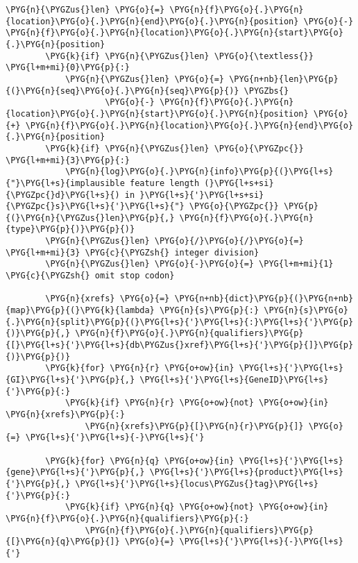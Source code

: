 \begin{Verbatim}[commandchars=\\\{\}]
        \PYG{n}{\PYGZus{}len} \PYG{o}{=} \PYG{n}{f}\PYG{o}{.}\PYG{n}{location}\PYG{o}{.}\PYG{n}{end}\PYG{o}{.}\PYG{n}{position} \PYG{o}{-} \PYG{n}{f}\PYG{o}{.}\PYG{n}{location}\PYG{o}{.}\PYG{n}{start}\PYG{o}{.}\PYG{n}{position}
        \PYG{k}{if} \PYG{n}{\PYGZus{}len} \PYG{o}{\textless{}} \PYG{l+m+mi}{0}\PYG{p}{:}
            \PYG{n}{\PYGZus{}len} \PYG{o}{=} \PYG{n+nb}{len}\PYG{p}{(}\PYG{n}{seq}\PYG{o}{.}\PYG{n}{seq}\PYG{p}{)} \PYGZbs{}
                    \PYG{o}{-} \PYG{n}{f}\PYG{o}{.}\PYG{n}{location}\PYG{o}{.}\PYG{n}{start}\PYG{o}{.}\PYG{n}{position} \PYG{o}{+} \PYG{n}{f}\PYG{o}{.}\PYG{n}{location}\PYG{o}{.}\PYG{n}{end}\PYG{o}{.}\PYG{n}{position}
        \PYG{k}{if} \PYG{n}{\PYGZus{}len} \PYG{o}{\PYGZpc{}} \PYG{l+m+mi}{3}\PYG{p}{:}
            \PYG{n}{log}\PYG{o}{.}\PYG{n}{info}\PYG{p}{(}\PYG{l+s}{"}\PYG{l+s}{implausible feature length (}\PYG{l+s+si}{\PYGZpc{}d}\PYG{l+s}{) in }\PYG{l+s}{'}\PYG{l+s+si}{\PYGZpc{}s}\PYG{l+s}{'}\PYG{l+s}{"} \PYG{o}{\PYGZpc{}} \PYG{p}{(}\PYG{n}{\PYGZus{}len}\PYG{p}{,} \PYG{n}{f}\PYG{o}{.}\PYG{n}{type}\PYG{p}{)}\PYG{p}{)}
        \PYG{n}{\PYGZus{}len} \PYG{o}{/}\PYG{o}{/}\PYG{o}{=} \PYG{l+m+mi}{3} \PYG{c}{\PYGZsh{} integer division}
        \PYG{n}{\PYGZus{}len} \PYG{o}{-}\PYG{o}{=} \PYG{l+m+mi}{1} \PYG{c}{\PYGZsh{} omit stop codon}

        \PYG{n}{xrefs} \PYG{o}{=} \PYG{n+nb}{dict}\PYG{p}{(}\PYG{n+nb}{map}\PYG{p}{(}\PYG{k}{lambda} \PYG{n}{s}\PYG{p}{:} \PYG{n}{s}\PYG{o}{.}\PYG{n}{split}\PYG{p}{(}\PYG{l+s}{'}\PYG{l+s}{:}\PYG{l+s}{'}\PYG{p}{)}\PYG{p}{,} \PYG{n}{f}\PYG{o}{.}\PYG{n}{qualifiers}\PYG{p}{[}\PYG{l+s}{'}\PYG{l+s}{db\PYGZus{}xref}\PYG{l+s}{'}\PYG{p}{]}\PYG{p}{)}\PYG{p}{)}
        \PYG{k}{for} \PYG{n}{r} \PYG{o+ow}{in} \PYG{l+s}{'}\PYG{l+s}{GI}\PYG{l+s}{'}\PYG{p}{,} \PYG{l+s}{'}\PYG{l+s}{GeneID}\PYG{l+s}{'}\PYG{p}{:}
            \PYG{k}{if} \PYG{n}{r} \PYG{o+ow}{not} \PYG{o+ow}{in} \PYG{n}{xrefs}\PYG{p}{:}
                \PYG{n}{xrefs}\PYG{p}{[}\PYG{n}{r}\PYG{p}{]} \PYG{o}{=} \PYG{l+s}{'}\PYG{l+s}{-}\PYG{l+s}{'}

        \PYG{k}{for} \PYG{n}{q} \PYG{o+ow}{in} \PYG{l+s}{'}\PYG{l+s}{gene}\PYG{l+s}{'}\PYG{p}{,} \PYG{l+s}{'}\PYG{l+s}{product}\PYG{l+s}{'}\PYG{p}{,} \PYG{l+s}{'}\PYG{l+s}{locus\PYGZus{}tag}\PYG{l+s}{'}\PYG{p}{:}
            \PYG{k}{if} \PYG{n}{q} \PYG{o+ow}{not} \PYG{o+ow}{in} \PYG{n}{f}\PYG{o}{.}\PYG{n}{qualifiers}\PYG{p}{:}
                \PYG{n}{f}\PYG{o}{.}\PYG{n}{qualifiers}\PYG{p}{[}\PYG{n}{q}\PYG{p}{]} \PYG{o}{=} \PYG{l+s}{'}\PYG{l+s}{-}\PYG{l+s}{'}


\end{Verbatim}
